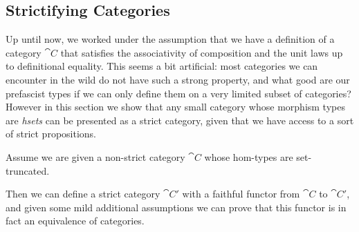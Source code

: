 \subsection{Strictifying Categories}\label{sec:cat-strictification}

Up until now, we worked under the assumption that we have a definition of
a category \( \cat{C} \) that satisfies the associativity of composition
and the unit laws up to definitional equality.
% 
This seems a bit artificial: most categories we can encounter in the wild 
do not have such a strong property, and what good are our prefascist types if
we can only define them on a very limited subset of categories?
% 
However in this section we show that any small category whose morphism types
are \emph{hsets} can be presented as a strict category, given that we have 
access to a sort  of strict propositions.

\begin{theorem}
    Assume we are given a non-strict category \( \cat{C} \) whose hom-types 
    are set-truncated.

    Then we can define a strict category \( \cat{C}' \) with a faithful functor 
    from \( \cat{C} \) to \( \cat{C}' \), and given some mild additional 
    assumptions we can prove that this functor is in fact an equivalence of
    categories.
\end{theorem}

